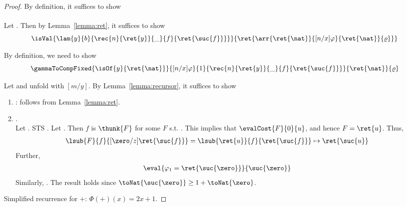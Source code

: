 \begin{proof}
By definition, it suffices to show\\
\\
Let . 
Then by Lemma~\ref{lemma:ret}, it suffices to show
\[
\isVal{\lam{y}{b}{\rec{n}{\ret{y}}{\_}{f}{\ret{\suc{f}}}}}{\ret{\arr{\ret{\nat}}{[n/x]\varphi}{\ret{\nat}}{\varrho}}}\]

By definition, we need to show 
\[
\gammaToCompFixed{\isOf{y}{\ret{\nat}}}{[n/x]\varphi}{1}{\rec{n}{\ret{y}}{\_}{f}{\ret{\suc{f}}}}{\ret{\nat}}{\varrho}
\]

Let  and unfold with $[m/y]$.  
By Lemma~\ref{lemma:recursor}, it suffices to show
\begin{enumerate}
    \item {}: follows from Lemma~\ref{lemma:ret}.
    \item {}.\\
    Let . STS 
    .
    Let . 
    Then $f$ is $\thunk{F}$ for some $F$ s.t. . 
    This implies that $\evalCost{F}{0}{u}$, and hence $F = \ret{u}$. 
         Thus,
        \begin{align*}
            &\lsub{F}{f}{[\zero/z]\ret{\suc{f}}} = \lsub{\ret{u}}{f}{\ret{\suc{f}}} \mapsto \ret{\suc{u}}
        \end{align*} 
        Further, 
        \begin{align*}
           &\eval{\varphi_1 = \ret{\suc{\zero}}}{\suc{\zero}}
        \end{align*}
        Similarly, .
        The result holds since $\toNat{\suc{\zero}} \ge 1 + \toNat{\zero}$.
\end{enumerate}

Simplified recurrence for $\plus$: $\Phi(\plus)(x) = 2x + 1$.
\end{proof}

